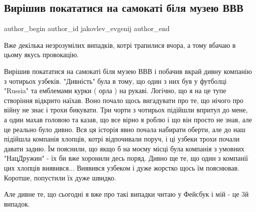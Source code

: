  
 
 
 
 
 
\subsection{Вирішив покататися на самокаті біля музею ВВВ}
\label{sec:24_08_2021.fb.jakovlev_evgenij.1.samokat_futbolka_russia_uzbeki}
 
\ifcmt
 author_begin
   author_id jakovlev_evgenij
 author_end
\fi

Вже декілька незрозумілих випадків, котрі трапилися вчора, а тому вбачаю в
цьому якусь провокацію. 

Вирішив покататися на самокаті біля музею ВВВ і побачив вкрай дивну компанію з
чотирьох узбеків. "Дивність" була в тому, що один з них був у футболці "Russia"
та емблемами курки ( орла ) на рукаві. Логічно, що я на це тупе створіння
відкрито наїхав. Воно почало щось вигадувати про те, що нічого про війну не
знає і трохи бикувати. Три чорти з чотирьох підійшли впритул до мене, а один
махав головою та казав, що все вірно я роблю і що він просто не знав, але це
реально було дивно. Вся ця історія явно почала набирати оберти, але до наш
підійшла компанія хлопців, котрі відпочивали поруч, і ці узбеки трохи почали
давати задню. Їм пояснили, що якщо б на моєму місці була компанія з умовних
"НацДружин" - їх би вже хоронили десь поряд. Дивно ще те, що один з компанії
цих хлопців виявився... Виявився узбеком і дуже жорстко щось їм пояснював.
Коротше, попустили їх дуже швидко.

Але дивне те, що сьогодні я вже про такі випадки читаю у Фейсбук і мій - це 3й
випадок.
